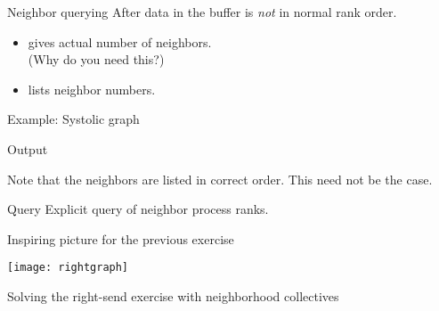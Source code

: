 \begin{numberedframe}{Neighbor querying}
  \label{sl:graph-neighbors}
  After  data in the buffer
  is \emph{not} in normal rank order.
  \begin{itemize}
  \item {} gives actual number of neighbors.\\
    (Why do you need this?)
  \item 
     lists neighbor numbers.
  \end{itemize}
\end{numberedframe}


\begin{numberedframe}{Example: Systolic graph}
\end{numberedframe}

\begin{numberedframe}{Output}
  \let\snippetoutputsize\scriptsize
  \def\snippetcodefraction{.4}
  \def\snippetlistfraction{.55}

  Note that the neighbors are listed in correct order.
  This need not be the case.
\end{numberedframe}

\begin{numberedframe}{Query}
  Explicit query of neighbor process ranks.

  \let\snippetoutputsize\scriptsize
\end{numberedframe}

\begin{exerciseframe}[rightgraph]
  \hyperlink{exserialsend}{}

  
\end{exerciseframe}

\begin{numberedframe}{Inspiring picture for the previous exercise}
  \label{fig:rightgraph}

  \texttt{[image: rightgraph]}

  Solving the right-send exercise with neighborhood
  collectives
\end{numberedframe}

